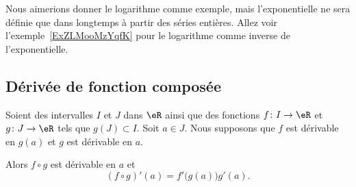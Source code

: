 \begin{example}
	Nous aimerions donner le logarithme comme exemple, mais l'exponentielle ne sera définie que dans longtemps à partir des séries entières. Allez voir l'exemple~\ref{ExZLMooMzYqfK} pour le logarithme comme inverse de l'exponentielle.
\end{example}

\subsection{Dérivée de fonction composée}

\begin{proposition}       \label{PROPooDONLooWthqRR}
	Soient des intervalles \( I\) et \( J\) dans \( \eR\) ainsi que des fonctions \( f\colon I\to \eR\) et \( g\colon J\to \eR\) tels que \( g(J)\subset I\). Soit \( a\in J\). Nous supposons que \( f\) est dérivable en \( g(a)\) et \( g\) est dérivable en \( a\).

	Alors \( f\circ g\) est dérivable en \( a\) et
	\begin{equation}
		(f\circ g)'(a)=f'\big( g(a) \big)g'(a).
	\end{equation}
\end{proposition}

